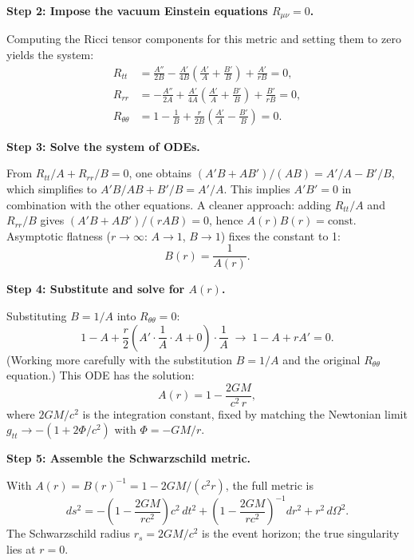\textbf{Step 2: Impose the vacuum Einstein equations $R_{\mu\nu} = 0$.}

Computing the Ricci tensor components for this metric and setting them to zero yields the system:
\begin{align}
R_{tt} &= \frac{A''}{2B} - \frac{A'}{4B}\left(\frac{A'}{A} + \frac{B'}{B}\right) + \frac{A'}{rB} = 0, \\
R_{rr} &= -\frac{A''}{2A} + \frac{A'}{4A}\left(\frac{A'}{A} + \frac{B'}{B}\right) + \frac{B'}{rB} = 0, \\
R_{\theta\theta} &= 1 - \frac{1}{B} + \frac{r}{2B}\left(\frac{A'}{A} - \frac{B'}{B}\right) = 0.
\end{align}

\textbf{Step 3: Solve the system of ODEs.}

From $R_{tt}/A + R_{rr}/B = 0$, one obtains $(A'B + AB')/(AB) = A'/A - B'/B$, which simplifies to $A'B/AB + B'/B = A'/A$. This implies $A' B' = 0$ in combination with the other equations. A cleaner approach: adding $R_{tt}/A$ and $R_{rr}/B$ gives $(A'B + AB')/(rAB) = 0$, hence $A(r)B(r) = \text{const}$. Asymptotic flatness ($r\to\infty$: $A\to 1$, $B\to 1$) fixes the constant to 1:
\begin{equation}
B(r) = \frac{1}{A(r)}.
\end{equation}

\textbf{Step 4: Substitute and solve for $A(r)$.}

Substituting $B = 1/A$ into $R_{\theta\theta} = 0$:
\begin{equation}
1 - A + \frac{r}{2}\left(A' \cdot \frac{1}{A}\cdot A + 0\right) \cdot \frac{1}{A} \;\longrightarrow\; 1 - A + rA' = 0.
\end{equation}
(Working more carefully with the substitution $B = 1/A$ and the original $R_{\theta\theta}$ equation.) This ODE has the solution:
\begin{equation}
A(r) = 1 - \frac{2GM}{c^2\,r},
\end{equation}
where $2GM/c^2$ is the integration constant, fixed by matching the Newtonian limit $g_{tt} \to -(1 + 2\Phi/c^2)$ with $\Phi = -GM/r$.

\textbf{Step 5: Assemble the Schwarzschild metric.}

With $A(r) = B(r)^{-1} = 1 - 2GM/(c^2 r)$, the full metric is
\begin{equation}
\boxed{ds^2 = -\left(1 - \frac{2GM}{rc^2}\right)c^2\,dt^2 + \left(1 - \frac{2GM}{rc^2}\right)^{-1}dr^2 + r^2\,d\Omega^2.}
\end{equation}
The Schwarzschild radius $r_s = 2GM/c^2$ is the event horizon; the true singularity lies at $r = 0$.

